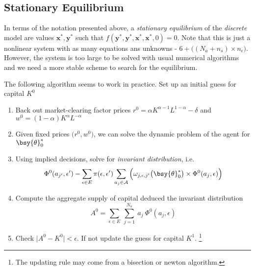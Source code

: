\documentclass[a4paper,10pt]{article}  %
\begin{document}
\subsection{Stationary Equilibrium} %
\label{sub:stationary_equilibrium}

In terms of the notation presented above, a \emph{stationary equilibrium} of the \emph{discrete} model
are values $\mathbf{x}^*, \mathbf{y}^*$ such that $f(\mathbf{y}^*,\mathbf{y}^*,\mathbf{x}^*,\mathbf{x}^*, 0)=0$.
Note that this is just a nonlinear system with as many equations ans unknowns - $6 + \big( (N_a+n_s) \times n_{\epsilon}\big)$.
However, the system is too large to be solved with usual numerical algorithms and we need a more stable scheme to search for the equilibrium.

The following algorithm seems to work in practice. Set up an initial guess for capital $K^0$
\begin{enumerate}

   \item Back out market-clearing factor prices $r^0 = \alpha K^{ \alpha -1 } L^{1-\alpha} - \delta $ and
         $ w^0 = (1-\alpha) K^{\alpha} L^{-\alpha}$

   \item Given fixed prices $ \big( r^0, w^0 \big) $, we can solve the dynamic problem of the agent for
         $\bsy{\theta}^*_0$

   \item Using implied decisions, solve for \emph{invariant distribution}, i.e.
         \begin{equation*}
            \Phi^0 ( a_{j'}, \epsilon' ) - \sum_{ \epsilon \in E } \pi( \epsilon, \epsilon' )
            \sum_{ a_j \in \mathcal{A} }
            \Big( \omega_{j,\epsilon, j'} \big( \bsy{\theta}_0^{*} \big) \times \Phi^0(a_j, \epsilon) \Big)
         \end{equation*}

   \item Compute the aggregate supply of capital deduced the invariant distribution
         \[
            A^0 = \sum_{\epsilon \in E} \ \sum_{ j=1 }^{N_a} \ a_j \ \Phi^0 ( a_j, \epsilon )
         \]

   \item Check $ \lvert A^0 - K^0 \rvert < \epsilon $. If not update the guess for capital $ K^1 $.%
         \footnote{The updating rule may come from a bisection or newton algorithm.}
\end{enumerate}
\end{document}
